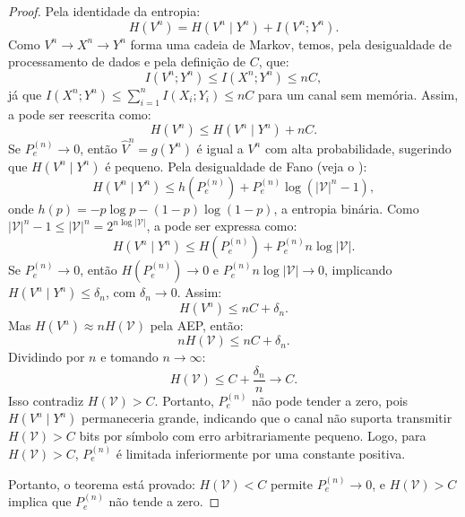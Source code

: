 \begin{proof}
Pela identidade da entropia:
\begin{equation}\label{eq:demtccfcA}
H(V^n) = H(V^n \mid Y^n) + I(V^n; Y^n).
\end{equation}
Como $V^n \to X^n \to Y^n$ forma uma cadeia de Markov, temos, pela desigualdade de 
processamento de dados e pela definição de $C$, que:
\begin{equation}
I(V^n; Y^n) \leq I(X^n; Y^n) \leq nC,
\end{equation}
já que $I(X^n; Y^n) \leq \sum_{i=1}^n I(X_i; Y_i) \leq nC$ para um canal sem memória. 
Assim, a  pode ser reescrita como:
\begin{equation}
H(V^n) \leq H(V^n \mid Y^n) + nC.
\end{equation}
Se $P_e^{(n)} \to 0$, então $\hat{V}^n = g(Y^n)$ é igual a $V^n$ com alta
probabilidade, sugerindo que $H(V^n \mid Y^n)$ é pequeno. Pela desigualdade de Fano (veja o ):
\begin{equation}\label{eq:demtccfcAB}
H(V^n \mid Y^n) \leq h(P_e^{(n)}) + P_e^{(n)} \log (|\mathcal{V}|^n - 1),
\end{equation}
onde $h(p) = -p \log p - (1-p) \log (1-p)$, a entropia binária. 
Como $|\mathcal{V}|^n - 1 \leq |\mathcal{V}|^n = 2^{n \log |\mathcal{V}|}$, 
a  pode ser expressa como:
\begin{equation}
H(V^n \mid Y^n) \leq H(P_e^{(n)}) + P_e^{(n)} n \log |\mathcal{V}|.
\end{equation}
Se $P_e^{(n)} \to 0$, então $H(P_e^{(n)}) \to 0$ e $P_e^{(n)} n \log |\mathcal{V}| \to 0$, 
implicando $H(V^n \mid Y^n) \leq \delta_n$, com $\delta_n \to 0$. Assim:
\begin{equation}
H(V^n) \leq nC + \delta_n.
\end{equation}
Mas $H(V^n) \approx n H(\mathcal{V})$ pela AEP, então:
\begin{equation}
n H(\mathcal{V}) \leq nC + \delta_n.
\end{equation}
Dividindo por $n$ e tomando $n \to \infty$:
\begin{equation}
H(\mathcal{V}) \leq C + \frac{\delta_n}{n} \to C.
\end{equation}
Isso contradiz $H(\mathcal{V}) > C$. Portanto, $P_e^{(n)}$ não pode tender a
zero, pois $H(V^n \mid Y^n)$ permaneceria grande, indicando que o canal não
suporta transmitir $H(\mathcal{V}) > C$ bits por símbolo com erro
arbitrariamente pequeno. Logo, para $H(\mathcal{V}) > C$, $P_e^{(n)}$ é
limitada inferiormente por uma constante positiva.

Portanto, o teorema está provado: $H(\mathcal{V}) < C$ permite $P_e^{(n)} \to 0$,
e $H(\mathcal{V}) > C$ implica que $P_e^{(n)}$ não tende a zero.
\end{proof}

